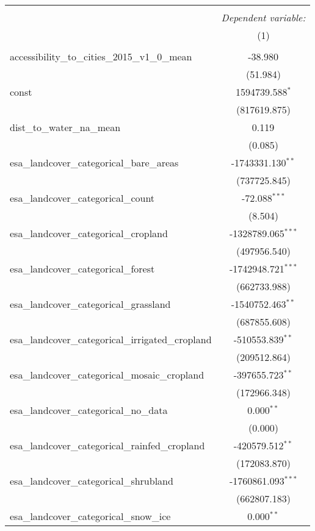 \begin{table}[!htbp] \centering
\begin{tabular}{@{\extracolsep{5pt}}lc}
\\[-1.8ex]\hline
\hline \\[-1.8ex]
& \multicolumn{1}{c}{\textit{Dependent variable:}} \
\cr \cline{1-2}
\\[-1.8ex] & (1) \\
\hline \\[-1.8ex]
 accessibility_to_cities_2015_v1_0_mean & -38.980$^{}$ \\
  & (51.984) \\
 const & 1594739.588$^{*}$ \\
  & (817619.875) \\
 dist_to_water_na_mean & 0.119$^{}$ \\
  & (0.085) \\
 esa_landcover_categorical_bare_areas & -1743331.130$^{**}$ \\
  & (737725.845) \\
 esa_landcover_categorical_count & -72.088$^{***}$ \\
  & (8.504) \\
 esa_landcover_categorical_cropland & -1328789.065$^{***}$ \\
  & (497956.540) \\
 esa_landcover_categorical_forest & -1742948.721$^{***}$ \\
  & (662733.988) \\
 esa_landcover_categorical_grassland & -1540752.463$^{**}$ \\
  & (687855.608) \\
 esa_landcover_categorical_irrigated_cropland & -510553.839$^{**}$ \\
  & (209512.864) \\
 esa_landcover_categorical_mosaic_cropland & -397655.723$^{**}$ \\
  & (172966.348) \\
 esa_landcover_categorical_no_data & 0.000$^{**}$ \\
  & (0.000) \\
 esa_landcover_categorical_rainfed_cropland & -420579.512$^{**}$ \\
  & (172083.870) \\
 esa_landcover_categorical_shrubland & -1760861.093$^{***}$ \\
  & (662807.183) \\
 esa_landcover_categorical_snow_ice & 0.000$^{**}$ \\

\end{tabular}
\end{table}
